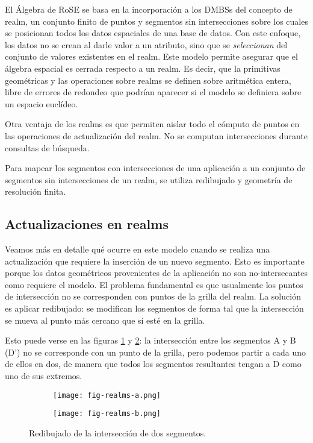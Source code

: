 El Álgebra de RoSE se basa en la incorporación a los DMBSs del concepto de realm, un conjunto finito de puntos y segmentos sin intersecciones
sobre los cuales se posicionan todos los datos espaciales de una base de datos.
Con este enfoque, los datos no se crean al darle valor a un atributo, sino que se \emph{seleccionan} del conjunto de
valores existentes en el realm.
Este modelo permite asegurar que el álgebra espacial es cerrada respecto a un realm.
Es decir, que la primitivas geométricas y las operaciones sobre realms se definen sobre
aritmética entera, libre de errores de redondeo que podrían aparecer si el modelo se definiera sobre un espacio euclídeo.

Otra ventaja de los realms es que permiten aislar todo el cómputo de puntos en las operaciones de actualización del realm.
No se computan intersecciones durante consultas de búsqueda.

Para mapear los segmentos con intersecciones de una aplicación a un conjunto de segmentos sin intersecciones de un realm,
se utiliza redibujado y geometría de resolución finita\textsuperscript{\cite{finite:resolution}}.

\subsection{Actualizaciones en realms} \label{realms:2}

Veamos más en detalle qué ocurre en este modelo cuando se realiza una actualización que requiere la inserción de un nuevo segmento.
Esto es importante porque los datos geométricos provenientes de la aplicación no son no-intersecantes como requiere el modelo.
El problema fundamental es que usualmente los puntos de intersección no se corresponden con puntos de la grilla del realm.
La solución es aplicar redibujado:
se modifican los segmentos de forma tal que la intersección se mueva al punto más cercano que sí esté en la grilla.

Esto puede verse en las figuras \ref{fig:realms:redibu:a} y \ref{fig:realms:redibu:b}:
la intersección entre los segmentos A y B (D') no se corresponde con un punto de la grilla,
pero podemos partir a cada uno de ellos en dos, de manera que todos los segmentos resultantes tengan a D como uno de sus extremos.

\begin{figure}
    \centering
    \begin{subfigure}[b]{0.3\textwidth}
        \texttt{[image: fig-realms-a.png]}
        \caption{}
        \label{fig:realms:redibu:a}
    \end{subfigure}
    \begin{subfigure}[b]{0.3\textwidth}
        \texttt{[image: fig-realms-b.png]}
        \caption{}
        \label{fig:realms:redibu:b}
    \end{subfigure}
    \caption{Redibujado de la intersección de dos segmentos.}
    \label{fig:realms:redibu}
\end{figure}

